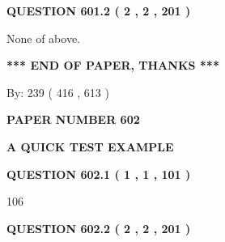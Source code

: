 \documentclass[12pt]{article}
\begin{document}
 
  
\vspace{0.2in}
  
{\textbf{\Large{QUESTION
601.2 
 ( 2 , 2 , 201 )
}}}
  
  
 
 
\noindent{}
 
 
 None of above.
 
 
 
 
   
   
 \vspace{0.2in}
 
   
   
   
   
\vspace{1.0in} 
{\textbf{\large{ *** END OF PAPER, THANKS *** }}} 
   
   
\hspace{1.0in} By: 
 239 ( 416 ,  613 )
   
   
   
   
\newpage 
\setcounter{page}{ 
   602001 } 
   
   
   
   
 {\textbf{ \Large{ PAPER NUMBER  602  }}}
   
   
\vspace{0.2in}
   
   
   
   
   
   
 \vspace{0.2in}
{\LARGE {\textbf{ A QUICK TEST EXAMPLE}}}
   
   
  
\vspace{0.2in}
  
{\textbf{\Large{QUESTION
602.1 
 ( 1 , 1 , 101 )
}}}
  
  
 
 
\noindent{}

106
 
 
  
\vspace{0.2in}
  
{\textbf{\Large{QUESTION
602.2 
 ( 2 , 2 , 201 )
}}}
  
  
 
 
\noindent{}
 
\end{document}

